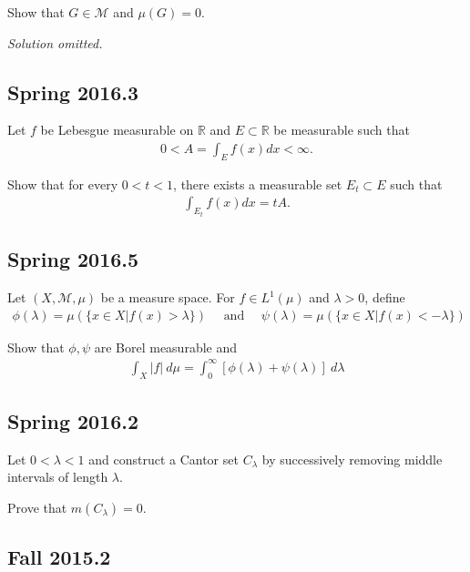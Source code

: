 Show that \(G \in \mathcal M\) and \(\mu(G) = 0\).


\emph{Solution omitted.}

\hypertarget{spring-2016.3}{%
\subsection{Spring 2016.3}\label{spring-2016.3}}

Let \(f\) be Lebesgue measurable on \({\mathbb{R}}\) and
\(E \subset {\mathbb{R}}\) be measurable such that
\begin{align*}
0<A=\int_{E} f(x) d x<\infty.
\end{align*}

Show that for every \(0 < t < 1\), there exists a measurable set
\(E_t \subset E\) such that
\begin{align*}
\int_{E_{t}} f(x) d x=t A.
\end{align*}

\hypertarget{spring-2016.5}{%
\subsection{Spring 2016.5}\label{spring-2016.5}}

Let \((X, \mathcal M, \mu)\) be a measure space. For \(f\in L^1(\mu)\)
and \(\lambda > 0\), define
\begin{align*}
\phi(\lambda)=\mu(\{x \in X | f(x)>\lambda\}) 
\quad \text { and } \quad 
\psi(\lambda)=\mu(\{x \in X | f(x)<-\lambda\})
\end{align*}

Show that \(\phi, \psi\) are Borel measurable and
\begin{align*}
\int_{X}|f| ~d \mu=\int_{0}^{\infty}[\phi(\lambda)+\psi(\lambda)] ~d \lambda
\end{align*}

\hypertarget{spring-2016.2}{%
\subsection{Spring 2016.2}\label{spring-2016.2}}

Let \(0 < \lambda < 1\) and construct a Cantor set \(C_\lambda\) by
successively removing middle intervals of length \(\lambda\).

Prove that \(m(C_\lambda) = 0\).

\hypertarget{fall-2015.2}{%
\subsection{Fall 2015.2}\label{fall-2015.2}}

